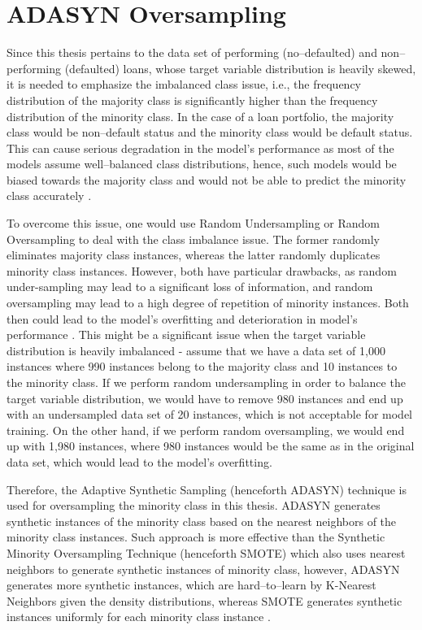 \newpage
\section{ADASYN Oversampling}
\label{sec:adasyntheory}
Since this thesis pertains to the data set of performing (no--defaulted) and non--performing (defaulted) loans, whose target variable distribution is heavily skewed, it is needed to emphasize the imbalanced class issue, i.e., the frequency distribution of the majority class is significantly higher than the frequency distribution of the minority class.
In the case of a loan portfolio, the majority class would be non--default status and the minority class would be default status.
This can cause serious degradation in the model's performance as most of the models assume well--balanced class distributions, hence, such models would be biased towards the majority class and would not be able to predict the minority class accurately \citep{prati2009data}.


To overcome this issue, one would use Random Undersampling or Random Oversampling to deal with the class imbalance issue. The former randomly eliminates majority class instances, whereas the latter randomly duplicates minority class instances.
However, both have particular drawbacks, as random under-sampling may lead to a significant loss of information, and random oversampling may lead to a high degree of repetition of minority instances. Both then could lead to the model's overfitting and deterioration in model's performance \citep{ma2013imbalanced}.
This might be a significant issue when the target variable distribution is heavily imbalanced - assume that we have a data set of 1,000 instances where 990 instances belong to the majority class and 10 instances to the minority class.
If we perform random undersampling in order to balance the target variable distribution, we would have to remove 980 instances and end up with an undersampled data set of 20 instances, which is not acceptable for model training.
On the other hand, if we perform random oversampling, we would end up with 1,980 instances, where 980 instances would be the same as in the original data set, which would lead to the model's overfitting.


Therefore, the Adaptive Synthetic Sampling (henceforth ADASYN) technique is used for oversampling the minority class in this thesis.
ADASYN generates synthetic instances of the minority class based on the nearest neighbors of the minority class instances.
Such approach is more effective than the Synthetic Minority Oversampling Technique (henceforth SMOTE) which also uses nearest neighbors to generate synthetic instances of minority class, however, ADASYN generates more synthetic instances, which are hard--to--learn by K-Nearest Neighbors given the density distributions, whereas SMOTE generates synthetic instances uniformly for each minority class instance \citep{adasynhaibo}.


